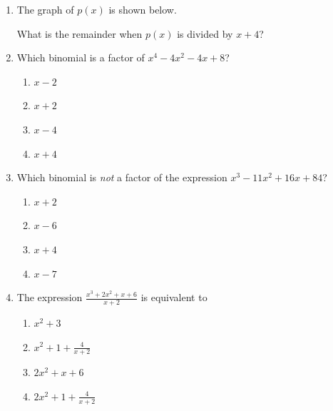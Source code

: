 \documentclass[12pt, oneside]{article}
\begin{document}
\begin{enumerate}
\item The graph of $p(x)$ is shown below.
\begin{center}
\end{center}
What is the remainder when $p(x)$ is divided by $x+4$? %

\item Which binomial is a factor of $x^4-4x^2-4x+8$?
\begin{enumerate}
    \item $x-2$
    \item $x+2$
    \item $x-4$
    \item $x+4$
\end{enumerate} %


\item Which binomial is \emph{not} a factor of the expression $x^3- 11x^2 +16x +84$?
\begin{enumerate}
    \item $x+2$
    \item $x-6$
    \item $x+4$
    \item $x-7$
\end{enumerate}

\item The expression $\displaystyle \frac{x^3+2x^2+x+6}{x+2}$ is equivalent to \begin{enumerate}
    \item $x^2+3$
    \item $\displaystyle x^2+1+\frac{4}{x+2}$
    \item $2x^2+x+6$
    \item $\displaystyle 2x^2+1+\frac{4}{x+2}$
\end{enumerate}


\end{enumerate}
\end{document}
